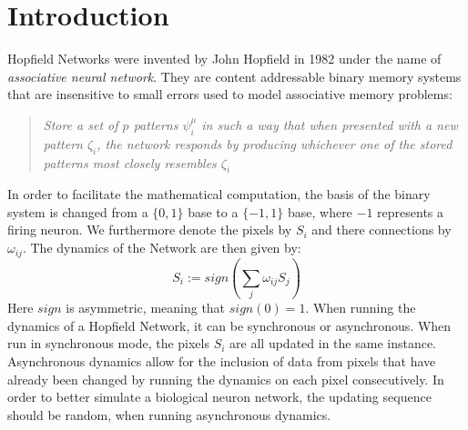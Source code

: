 \section{Introduction}

Hopfield Networks were invented by John Hopfield in 1982 under the name of \textit{associative neural network}. They are content addressable binary memory systems that are insensitive to small errors used to model associative memory problems: 
\begin{quote}
\textit{Store a set of $p$ patterns $\psi_i^\mu$ in such a way that when presented with a new pattern $\zeta_i$, the network responds by producing whichever one of the stored patterns most closely resembles $\zeta_i$} \citep{Polk:2002fk}
\end{quote}

In order to facilitate the mathematical computation, the basis of the binary system is changed from a $\{0,1\}$ base to a $\{-1,1\}$ base, where $-1$ represents a firing neuron. We furthermore denote the pixels by $S_i$ and there connections by $\omega_{ij}$. The dynamics of the Network are then given by:
\begin{equation}
S_i := sign \left( \sum_j \omega_{ij} S_j \right)
\label{eq: sequential dynamics}
\end{equation}
Here $sign$ is asymmetric, meaning that $sign(0)=1$. 
When running the dynamics of a Hopfield Network, it can be synchronous or asynchronous. When run in synchronous mode, the pixels $S_i$ are all updated in the same instance. Asynchronous dynamics allow for the inclusion of data from pixels that have already been changed by running the dynamics on each pixel consecutively. In order to better simulate a biological neuron network, the updating sequence should be random, when running asynchronous dynamics. 

